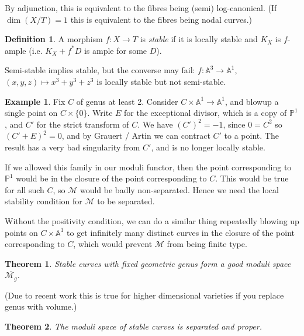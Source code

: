 \documentclass{article}
\newtheorem*{theorem}{Theorem}
\theoremstyle{definition}
\newtheorem*{definition}{Definition}
\newtheorem*{example}{Example}
\newcommand{\closure}[1]{\overline{#1}}
\newcommand{\M}{\mathcal{M}}
\newcommand{\A}{\mathbb{A}}
\renewcommand{\P}{\mathbb{P}}
\begin{document}
By adjunction, this is equivalent to the fibres being (semi) log-canonical. (If
$\dim(X/T)=1$ this is equivalent to the fibres being nodal curves.)

\begin{definition}
    A morphism $f:X\to T$ is \emph{stable} if it is locally stable and $K_X$ is
    $f$-ample (i.e. $K_X+f^*D$ is ample for some $D$).
\end{definition}

Semi-stable implies stable, but the converse may fail: $f:\A^3\to\A^1$,
$(x,y,z)\mapsto x^3+y^3+z^3$ is locally stable but not semi-stable.

\begin{example}
    Fix $C$ of genus at least 2. Consider $C\times\A^1\to\A^1$, and blowup a
    single point on $C\times\{0\}$. Write $E$ for the exceptional divisor, which
    is a copy of $\P^1$, and $C'$ for the strict transform of $C$. We have
    $(C')^2=-1$, since $0=C^2$ so $(C'+E)^2=0$, and by Grauert / Artin we can
    contract $C'$ to a point. The result has a very bad singularity from $C'$,
    and is no longer locally stable.
\end{example}

If we allowed this family in our moduli functor, then the point corresponding to
$\P^1$ would be in the closure of the point corresponding to $C$. This would be
true for all such $C$, so $\M$ would be badly non-separated. Hence we need the
local stability condition for $\M$ to be separated.

Without the positivity condition, we can do a similar thing repeatedly blowing
up points on $C\times\A^1$ to get infinitely many distinct curves in the closure
of the point corresponding to $C$, which would prevent $\M$ from being finite
type.

\begin{theorem}
    Stable curves with fixed geometric genus form a good moduli space
    $\closure{\M_g}$.
\end{theorem}

(Due to recent work this is true for higher dimensional varieties if you replace
genus with volume.)

\begin{theorem}
    The moduli space of stable curves is separated and proper.
\end{theorem}
\end{document}

